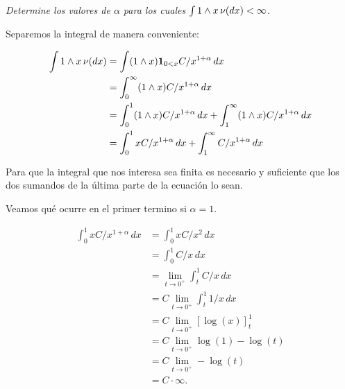 \emph{
	Determine los valores de $\alpha$ para los cuales \pn
	$\int 1\wedge x\,\nu\!\left( dx\right) <\infty$.
}

\afterstatement\pn

Separemos la integral de manera conveniente:

\begin{align}
   \int 1\wedge x\, \nu(dx) &= \int (1 \wedge x) {\bf{1}}_{0<x} C/x^{1+\alpha} \,dx                                                 \\
                            &= \int_0^\infty (1 \wedge x) C/x^{1+\alpha} \,dx                                                   \\
                            &= \int_0^1 (1 \wedge x) C/x^{1+\alpha} \,dx + \int_1^\infty (1 \wedge x) C/x^{1+\alpha} \,dx       \\
                            &= \int_0^1 x C/x^{1+\alpha} \,dx + \int_1^\infty C/x^{1+\alpha} \,dx                               \label{problema5_2:descomposicion_de_integral}
\end{align}

Para que la integral que nos interesa sea finita es necesario y suficiente que los dos sumandos de la última 
parte de la ecuación lo sean. \pn

Veamos qué ocurre en el primer termino si $\alpha = 1$.

\begin{align}
    \int_0^1 x C/x^{1+\alpha} \,dx  &=  \int_0^1 x C/x^{2} \,dx                                                 \\
                                    &=  \int_0^1 C/x \,dx                                                       \\
                                    &=  \lim_{t \rightarrow 0^+}\int_t^1 C/x \,dx                               \\
                                    &=  C \lim_{t \rightarrow 0^+} \int_t^1 1/x \,dx                            \\
                                    &=  C \lim_{t \rightarrow 0^+} [\log(x)]_t^1                                \\
                                    &=  C \lim_{t \rightarrow 0^+} \log(1) - \log(t)                            \\
                                    &=  C \lim_{t \rightarrow 0^+} - \log(t)                                    \\
                                    &=  C \cdot \infty.                                                                
\end{align}\pn

